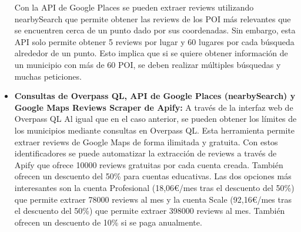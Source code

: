 \begin{itemize}
    Con la API de Google Places se pueden extraer reviews utilizando nearbySearch que permite obtener las reviews de los POI más relevantes que se encuentren cerca de un punto dado por sus coordenadas. 
    Sin embargo, esta API solo permite obtener 5 reviews por lugar y 60 lugares por cada búsqueda alrededor de un punto. Esto implica que si se quiere obtener información de un municipio con más de 60 POI, se deben realizar múltiples búsquedas y muchas peticiones.
    \item \textbf{Consultas de Overpass QL, API de Google Places (nearbySearch) y Google Maps Reviews Scraper de Apify:} A través de la interfaz web de Overpass QL
    Al igual que en el caso anterior, se pueden obtener los límites de los municipios mediante consultas en Overpass QL.
    Esta herramienta permite extraer reviews de Google Maps de forma ilimitada y gratuita.
    Con estos identificadores se puede automatizar la extracción de reviews a través de Apify que ofrece 10000 reviews gratuitas por cada cuenta creada.
    También ofrecen un descuento del 50\% para cuentas educativas. Las dos opciones más interesantes son la cuenta Profesional (18,06€/mes tras el descuento del 50\%) que permite extraer 78000 reviews al mes y la cuenta Scale (92,16€/mes tras el descuento del 50\%) que permite extraer 398000 reviews al mes. También ofrecen un descuento de 10\% si se paga anualmente.
\end{itemize}